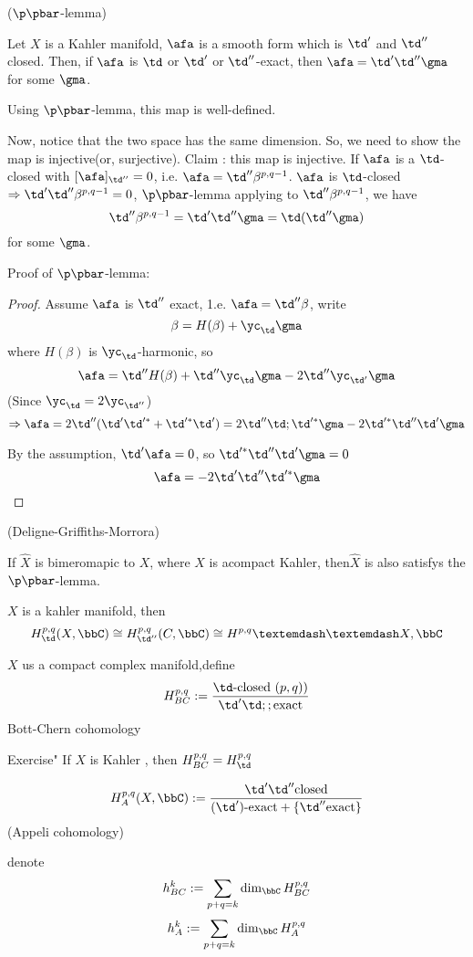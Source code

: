 \begin{lemma}($\p\pbar$-lemma)

Let $X$ is a Kahler manifold, $\afa$ is a smooth form which is
$\td'$ and $\td''$ closed. Then, if $\afa$ is
$\td$ or $\td'$ or $\td''$-exact, then $\afa=\td'\td''\gma$
for some $\gma$.
\end{lemma}

Using $\p\pbar$-lemma, this map is well-defined.

Now, notice that the two space has the same dimension. So,
we need to show the map is injective(or, surjective).
Claim : this map is injective. If $\afa$ is a $\td$-closed
with $[\afa]_{\td''}=0$, i.e. $\afa=\td''\beta^{p,q-1}$.
$\afa$ is $\td$-closed$\Rightarrow\td'\td''\beta^{p,q-1}=0$,
$\p\pbar$-lemma applying to $\td''\beta^{p,q-1}$, we have
$$\td''\beta^{p,q-1}=\td'\td''\gma=\td(\td''\gma)$$
for some $\gma$.

\vs

Proof of $\p\pbar$-lemma:

\begin{proof}
Assume $\afa$ is $\td''$ exact, 1.e. $\afa=\td''\beta$,
write
$$\beta=H(\beta)+\yc_\td\gma$$
where $H(\beta)$ is $\yc_\td$-harmonic, so
$$\afa=\td'' H(\beta)+\td''\yc_\td\gma-2\td''\yc_{\td'}\gma$$
(Since $\yc_\td=2\yc_{\td''}$)
$$\Rightarrow\afa=2\td''(\td'\td'^*+\td'^*\td')
=2\td''\td;\td'^*\gma-2\td'^*\td''\td'\gma$$

By the assumption, $\td'\afa=0$, so
$\td'^*\td''\td'\gma=0$
$$\afa=-2\td'\td''\td'^*\gma$$
\end{proof}

\begin{rem}(Deligne-Griffiths-Morrora)

If $\widehat{X}$ is bimeromapic to $X$, where $X$ is
acompact Kahler, then$\hat{X}$ is also satisfys the $\p\pbar$-lemma.

$X$ is a kahler manifold, then
$$H^{p,q}_\td(X,\bbC)\cong H^{p,q}_{\td''}(C,\bbC)\cong
H^{p,q}——{X,\bbC}$$
\end{rem}

$X$ us a compact complex manifold,define
$$H_{BC}^{p,q}:=
\frac{\td\text{-closed $(p,q)$)}}{\td'\td;;\text{exact}}$$
Bott-Chern cohomology

Exercise" If $X$ is Kahler , then $H^{p,q}_{BC}=H^{p,q}_\td$

$$H^{p,q}_A(X,\bbC):=
\frac{\td'\td''\text{closed}}{(\td')\text{-exact}+\{\td''\text{exact}\}}$$
(Appeli cohomology)

denote
$$h_{BC}^k:=\sum_{p+q=k}\dim_{\bbC}H_{BC}^{p,q}$$
$$h_{A}^k:=\sum_{p+q=k}\dim_{\bbC}H_{A}^{p,q}$$

